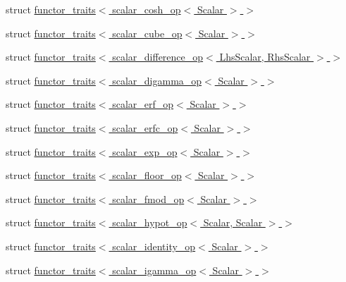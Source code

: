 \begin{DoxyCompactItemize}
\item 
struct \hyperlink{struct_eigen_1_1internal_1_1functor__traits_3_01scalar__cosh__op_3_01_scalar_01_4_01_4}{functor\+\_\+traits$<$ scalar\+\_\+cosh\+\_\+op$<$ Scalar $>$ $>$}
\item 
struct \hyperlink{struct_eigen_1_1internal_1_1functor__traits_3_01scalar__cube__op_3_01_scalar_01_4_01_4}{functor\+\_\+traits$<$ scalar\+\_\+cube\+\_\+op$<$ Scalar $>$ $>$}
\item 
struct \hyperlink{struct_eigen_1_1internal_1_1functor__traits_3_01scalar__difference__op_3_01_lhs_scalar_00_01_rhs_scalar_01_4_01_4}{functor\+\_\+traits$<$ scalar\+\_\+difference\+\_\+op$<$ Lhs\+Scalar, Rhs\+Scalar $>$ $>$}
\item 
struct \hyperlink{struct_eigen_1_1internal_1_1functor__traits_3_01scalar__digamma__op_3_01_scalar_01_4_01_4}{functor\+\_\+traits$<$ scalar\+\_\+digamma\+\_\+op$<$ Scalar $>$ $>$}
\item 
struct \hyperlink{struct_eigen_1_1internal_1_1functor__traits_3_01scalar__erf__op_3_01_scalar_01_4_01_4}{functor\+\_\+traits$<$ scalar\+\_\+erf\+\_\+op$<$ Scalar $>$ $>$}
\item 
struct \hyperlink{struct_eigen_1_1internal_1_1functor__traits_3_01scalar__erfc__op_3_01_scalar_01_4_01_4}{functor\+\_\+traits$<$ scalar\+\_\+erfc\+\_\+op$<$ Scalar $>$ $>$}
\item 
struct \hyperlink{struct_eigen_1_1internal_1_1functor__traits_3_01scalar__exp__op_3_01_scalar_01_4_01_4}{functor\+\_\+traits$<$ scalar\+\_\+exp\+\_\+op$<$ Scalar $>$ $>$}
\item 
struct \hyperlink{struct_eigen_1_1internal_1_1functor__traits_3_01scalar__floor__op_3_01_scalar_01_4_01_4}{functor\+\_\+traits$<$ scalar\+\_\+floor\+\_\+op$<$ Scalar $>$ $>$}
\item 
struct \hyperlink{struct_eigen_1_1internal_1_1functor__traits_3_01scalar__fmod__op_3_01_scalar_01_4_01_4}{functor\+\_\+traits$<$ scalar\+\_\+fmod\+\_\+op$<$ Scalar $>$ $>$}
\item 
struct \hyperlink{struct_eigen_1_1internal_1_1functor__traits_3_01scalar__hypot__op_3_01_scalar_00_01_scalar_01_4_01_4}{functor\+\_\+traits$<$ scalar\+\_\+hypot\+\_\+op$<$ Scalar, Scalar $>$ $>$}
\item 
struct \hyperlink{struct_eigen_1_1internal_1_1functor__traits_3_01scalar__identity__op_3_01_scalar_01_4_01_4}{functor\+\_\+traits$<$ scalar\+\_\+identity\+\_\+op$<$ Scalar $>$ $>$}
\item 
struct \hyperlink{struct_eigen_1_1internal_1_1functor__traits_3_01scalar__igamma__op_3_01_scalar_01_4_01_4}{functor\+\_\+traits$<$ scalar\+\_\+igamma\+\_\+op$<$ Scalar $>$ $>$}

\end{DoxyCompactItemize}
